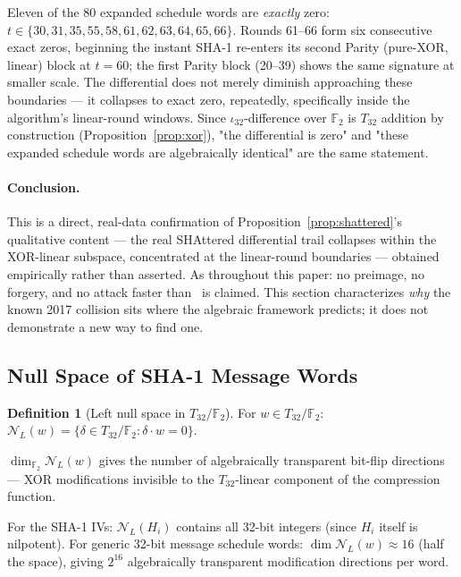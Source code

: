 \documentclass[runningheads]{llncs}
\theoremstyle{plain}
\theoremstyle{definition}
\newtheorem{definition}[theorem]{Definition}
\newcommand{\GFtwo}{\mathbb{F}_2}
\begin{document}
Eleven of the 80 expanded schedule words are \emph{exactly} zero:
$t \in \{30,31,35,55,58,61,62,63,64,65,66\}$. Rounds 61--66 form six
consecutive exact zeros, beginning the instant SHA-1 re-enters its second
Parity (pure-XOR, linear) block at $t=60$; the first Parity block
(20--39) shows the same signature at smaller scale. The differential does
not merely diminish approaching these boundaries — it collapses to exact
zero, repeatedly, specifically inside the algorithm's linear-round
windows. Since $\iota_{32}$-difference over $\GFtwo$ is $T_{32}$ addition
by construction (Proposition~\ref{prop:xor}), "the differential is zero"
and "these expanded schedule words are algebraically identical" are the
same statement.

\paragraph{Conclusion.} This is a direct, real-data confirmation of
Proposition~\ref{prop:shattered}'s qualitative content — the real
SHAttered differential trail collapses within the XOR-linear subspace,
concentrated at the linear-round boundaries — obtained empirically rather
than asserted. As throughout this paper: no preimage, no forgery, and no
attack faster than~\cite{Stevens2017} is claimed. This section
characterizes \emph{why} the known 2017 collision sits where the
algebraic framework predicts; it does not demonstrate a new way to find
one.

\subsection{Null Space of SHA-1 Message Words}

\begin{definition}[Left null space in $T_{32}/\GFtwo$]
For $w \in T_{32}/\GFtwo$:
$\mathcal{N}_L(w) = \{\delta \in T_{32}/\GFtwo : \delta \cdot w = 0\}$.
\end{definition}

$\dim_{\GFtwo} \mathcal{N}_L(w)$ gives the number of algebraically transparent
bit-flip directions — XOR modifications invisible to the $T_{32}$-linear
component of the compression function.

For the SHA-1 IVs: $\mathcal{N}_L(H_i)$ contains all 32-bit integers
(since $H_i$ itself is nilpotent). For generic 32-bit message schedule words:
$\dim \mathcal{N}_L(w) \approx 16$ (half the space), giving $2^{16}$
algebraically transparent modification directions per word.
\end{document}
